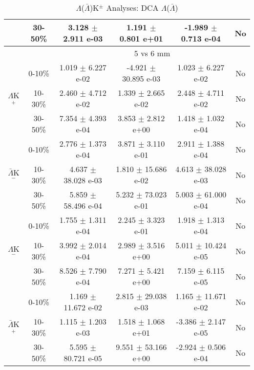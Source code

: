 \documentclass[../AnalysisNoteJBuxton.tex]{subfiles}
\begin{document}
\begin{table}
\begin{tabular}{|c|c|c|c|c|c|}
   & 30-50\% & 3.128 $\pm$ 2.911 e-03 & 1.191 $\pm$ 0.801 e+01 & -1.989 $\pm$ 0.713 e-04 & No \\  
  \hline
  \multicolumn{2}{|c}{} & \multicolumn{4}{c|}{5 vs 6 mm} \\
  \hline  
  \multirow{3}{*}{$\Lambda$K$^{+}$}   
   &  0-10\% & 1.019 $\pm$ 6.227 e-02 & -4.921 $\pm$ 30.895 e-03 & 1.023 $\pm$ 6.227 e-02 & No \\
   & 10-30\% & 2.460 $\pm$ 4.712 e-02 & 1.339 $\pm$ 2.665 e-02 & 2.448 $\pm$ 4.711 e-02 & No \\
   & 30-50\% & 7.354 $\pm$ 4.393 e-04 & 3.853 $\pm$ 2.812 e+00 & 1.418 $\pm$ 1.032 e-04 & No \\
  \hline  
  \multirow{3}{*}{$\bar{\Lambda}$K$^{-}$}
   & 0-10\% & 2.776 $\pm$ 1.373 e-04 & 3.871 $\pm$ 3.110 e-01 & 2.911 $\pm$ 1.388 e-04 & No \\
   & 10-30\% & 4.637 $\pm$ 38.028 e-03 & 1.810 $\pm$ 15.686 e-02 & 4.613 $\pm$ 38.028 e-03 & No \\
   & 30-50\% & 5.859 $\pm$ 58.496 e-04 & 5.232 $\pm$ 73.023 e-01 & 5.003 $\pm$ 61.000 e-04 & No \\
  \hline \hline
  \multirow{3}{*}{$\Lambda$K$^{-}$}   
   &  0-10\% & 1.755 $\pm$ 1.311 e-04 & 2.245 $\pm$ 3.323 e-01 & 1.918 $\pm$ 1.313 e-04 & No \\
   & 10-30\% & 3.992 $\pm$ 2.014 e-04 & 2.989 $\pm$ 3.516 e+00 & 5.011 $\pm$ 10.424 e-05 & No \\
   & 30-50\% & 8.526 $\pm$ 7.790 e-04 & 7.271 $\pm$ 5.421 e+00 & 7.159 $\pm$ 6.115 e-05 & No \\
  \hline  
  \multirow{3}{*}{$\bar{\Lambda}$K$^{+}$}
   & 0-10\% & 1.169 $\pm$ 11.672 e-02 & 2.815 $\pm$ 29.038 e-03 & 1.165 $\pm$ 11.671 e-02 & No \\
   & 10-30\% & 1.115 $\pm$ 1.203 e-03 & 1.518 $\pm$ 1.068 e+01 & -3.386 $\pm$ 2.147 e-05 & No \\
   & 30-50\% & 5.595 $\pm$ 80.721 e-05 & 9.551 $\pm$ 53.166 e+00 & -2.924 $\pm$ 0.506 e-04 & No \\  
  \hline
 \end{tabular}
 \caption{$\Lambda$($\bar{\Lambda}$)K$^{\pm}$ Analyses: DCA $\Lambda$($\bar{\Lambda}$)}
 \label{tab:V0DcaLamKchFull}
\end{table}
\end{document}
